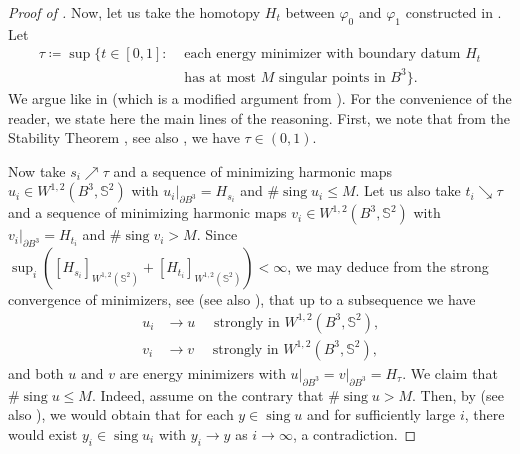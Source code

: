 \documentclass[12pt]{amsart}
\newcommand{\sing}{\operatorname{sing}}
\def\S{{\mathbb S}}
\newcommand{\brac}[1]{\left (#1 \right )}
\numberwithin{theorem}{section} \numberwithin{equation}{section}
\begin{document}
\begin{proof}[Proof of ]
Now, let us take the homotopy $H_t$ between $\varphi_0$ and $\varphi_1$ constructed in . Let
\[
\begin{split}
 \tau \coloneqq \sup\{t\in[0,1]\colon &\text{ each energy minimizer with boundary datum $H_t$}\\
 &\text{ has at most $M$ singular points in } B^3\}\text{.}
 \end{split}
\]
We argue like in \cite[Remark 4.1]{MazowieckaStrzelecki} (which is a modified argument from \cite[Section 5]{HardtLin89}).
For the convenience of the reader, we state here the main lines of the reasoning. First, we note that from the Stability Theorem \cite{HardtLin89}, see also \cite[Theorem 8.9]{MMS}, we have $\tau\in(0,1)$.

Now take $s_i \nearrow \tau$ and a sequence of minimizing harmonic maps $u_i\in W^{1,2}(B^3,\S^2)$ with $u_i\big\rvert_{\partial B^3} = H_{s_i}$ and $\# \sing u_i \le M$. 
Let us also take $t_i \searrow \tau$ and a sequence of minimizing harmonic maps $v_i\in W^{1,2}(B^3,\S^2)$ with $v_i\big\rvert_{\partial B^3} = H_{t_i}$ and $\# \sing v_i > M$. 
Since $\sup_i \brac{[H_{s_i}]_{W^{1,2}(\S^2)}+ [H_{t_i}]_{W^{1,2}(\S^2)}} <\infty$, we may deduce from the strong convergence of minimizers, see \cite[Theorem 1.2 (4)]{AL88} (see also \cite[Theorem 6.1 (3)]{MMS}), that up to a subsequence we have
\[
\begin{split}
 u_i &\to u \quad \text{ strongly in } W^{1,2}(B^3,\S^2)\text{,}\\
 v_i &\to v \quad \text{ strongly in } W^{1,2}(B^3,\S^2)\text{,}
\end{split}
 \]
and both $u$ and $v$ are energy minimizers with $u\big\rvert_{\partial B^3} = v\big\rvert_{\partial B^3} = H_\tau$. 
We claim that $\#\sing u \le M$. 
Indeed, assume on the contrary that $\# \sing u >M$. 
Then, by \cite[Theorem 1.8 (2)]{AL88} (see also \cite[Theorem 2.10]{MMS}), we would obtain that for each $y\in \sing u$ and for sufficiently large $i$, there would exist $y_i \in \sing u_i$ with $y_i \to y$ as $i\to \infty$, a contradiction.


\end{proof}
\end{document}
